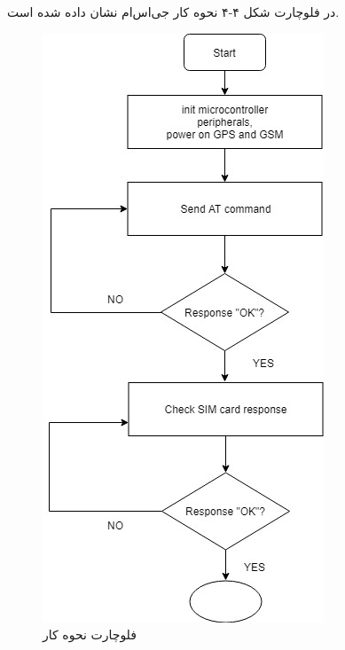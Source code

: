 \newpage
در فلوچارت شکل ۴-۴ نحوه کار جی‌اس‌ام نشان داده شده است.\\
\begin{figure}[!h]
	\centerline{\includegraphics[width=.6\textwidth]{gsm-flowchart}}
	\caption{فلوچارت نحوه کار  \cite{ElShafee2013}}
\end{figure}
\newpage
